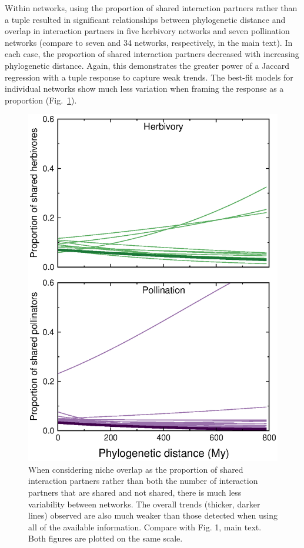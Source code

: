 \documentclass[12pt]{article}
\begin{document}
\begin{spacing}{1.5}
    Within networks, using the proportion of shared interaction partners rather than a tuple resulted in significant relationships between phylogenetic distance and overlap in interaction partners in five herbivory networks and seven pollination networks (compare to seven and 34 networks, respectively, in the main text). In each case, the proportion of shared interaction partners decreased with increasing phylogenetic distance. Again, this demonstrates the greater power of a Jaccard regression with a tuple response to capture weak trends. The best-fit models for individual networks show much less variation when framing the response as a proportion (Fig.~\ref{lineplot}).


    \begin{figure}[!h]
        \begin{center}
          \centerline{\includegraphics*[width=.75\textwidth]{Figures/dataplots/proportion_regression_lines_full_color.eps}}
        \end{center}
         \caption{\small When considering niche overlap as the proportion of shared interaction partners rather than both the number of interaction partners that are shared and not shared, there is much less variability between networks. The overall trends (thicker, darker lines) observed are also much weaker than those detected when using all of the available information. Compare with Fig. 1, main text. Both figures are plotted on the same scale.
         }
        \label{lineplot}
      \end{figure}




\end{spacing}
\end{document}
